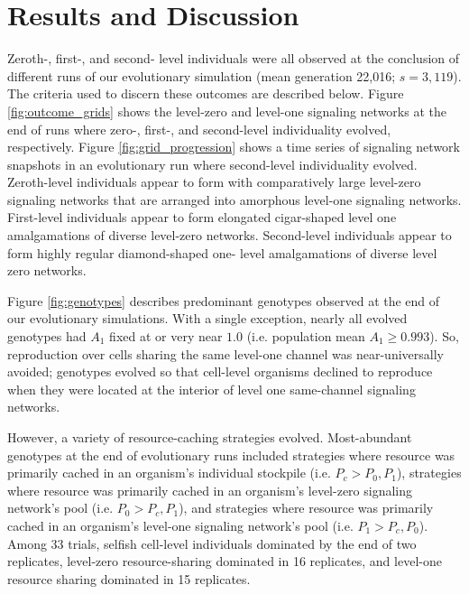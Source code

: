 \section{Results and Discussion}













Zeroth-, first-, and second- level individuals were all observed at the conclusion of different runs of our evolutionary simulation (mean generation 22,016; $s=3,119$).
The criteria used to discern these outcomes are described below.
Figure \ref{fig:outcome_grids} shows the level-zero and level-one signaling networks at the end of runs where zero-, first-, and second-level individuality evolved, respectively.
Figure \ref{fig:grid_progression} shows a time series of signaling network snapshots in an evolutionary run where second-level individuality evolved.
Zeroth-level individuals appear to form with comparatively large level-zero signaling networks that are arranged into amorphous level-one signaling networks.
First-level individuals appear to form elongated cigar-shaped level one amalgamations of diverse level-zero networks.
Second-level individuals appear to form highly regular diamond-shaped one- level amalgamations of diverse level zero networks.

Figure \ref{fig:genotypes} describes predominant genotypes observed at the end of our evolutionary simulations.
With a single exception, nearly all evolved genotypes had $A_1$ fixed at or very near $1.0$ (i.e. population mean $A_1 \geq 0.993$).
So, reproduction over cells sharing the same level-one channel was near-universally avoided;
genotypes evolved so that cell-level organisms declined to reproduce when they were located at the interior of level one same-channel signaling networks.

However, a variety of resource-caching strategies evolved.
Most-abundant genotypes at the end of evolutionary runs included strategies where resource was primarily cached in an organism's individual stockpile (i.e. $P_{c} > P_0, P_1$), strategies where resource was primarily cached in an organism's level-zero signaling network's pool (i.e. $P_0 > P_{c}, P_1$), and strategies where resource was primarily cached in an organism's level-one signaling network's pool (i.e. $P_1 > P_{c}, P_0$).
Among 33 trials, selfish cell-level individuals dominated by the end of two replicates, level-zero resource-sharing dominated in 16 replicates, and level-one resource sharing dominated in 15 replicates.

